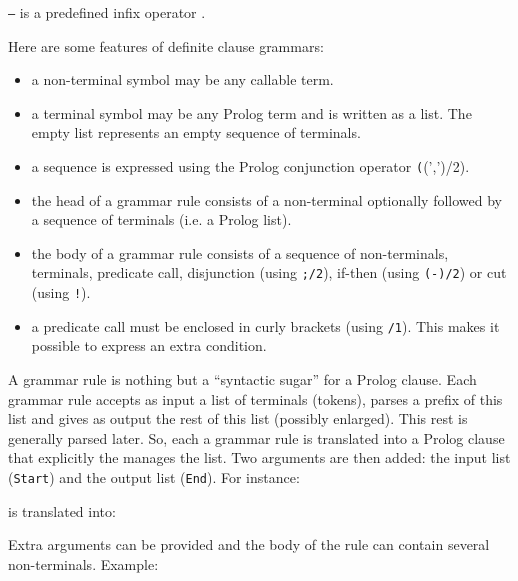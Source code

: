 
\texttt{--{\gt}} is a predefined infix operator .

Here are some features of definite clause grammars:

\begin{itemize}

\item a non-terminal symbol may be any callable term.

\item a terminal symbol may be any Prolog term and is written as a list. The
  empty list represents an empty sequence of terminals.

\item a sequence is expressed using the Prolog conjunction operator
  \texttt((',')/2).

\item the head of a grammar rule consists of a non-terminal optionally
  followed by a sequence of terminals (i.e. a Prolog list).

\item the body of a grammar rule consists of a sequence of non-terminals,
  terminals, predicate call, disjunction (using \texttt{;/2}), if-then (using
  \texttt{(-{\gt})/2}) or cut (using \texttt{!}).

\item a predicate call must be enclosed in curly brackets (using
  \texttt{{\lb}{\rb}/1}). This makes it possible to express an extra
  condition.

\end{itemize}

A grammar rule is nothing but a ``syntactic sugar'' for a Prolog clause. Each
grammar rule accepts as input a list of terminals (tokens), parses a prefix
of this list and gives as output the rest of this list (possibly enlarged).
This rest is generally parsed later. So, each a grammar rule is translated
into a Prolog clause that explicitly the manages the list. Two arguments
are then added: the input list (\texttt{Start}) and the output list
(\texttt{End}). For instance:


is translated into:


Extra arguments can be provided and the body of the rule can contain several
non-terminals. Example:

